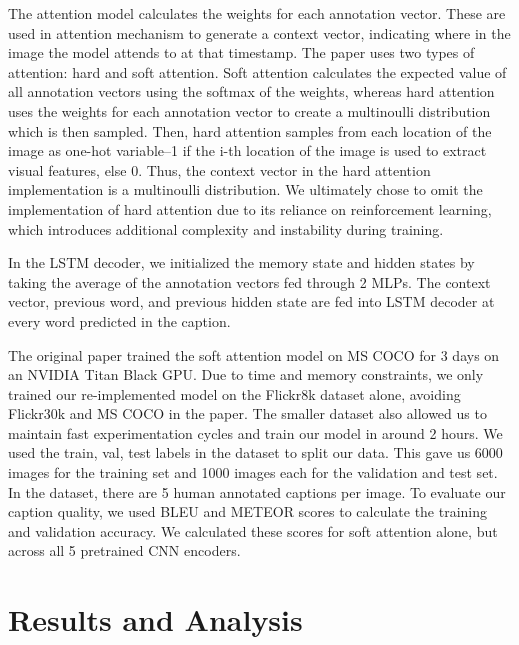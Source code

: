 \documentclass{article}
\begin{document}
The attention model calculates the weights for each annotation vector. These are used in attention mechanism to generate a context vector, indicating where in the image the model attends to at that timestamp. The paper uses two types of attention: hard and soft attention. Soft attention calculates the expected value of all annotation vectors using the softmax of the weights, whereas hard attention uses the weights for each annotation vector to create a multinoulli distribution which is then sampled. Then, hard attention samples from each location of the image as one-hot variable--1 if the i-th location of the image is used to extract visual features, else 0. Thus, the context vector in the hard attention implementation is a multinoulli distribution. We ultimately chose to omit the implementation of hard attention due to its reliance on reinforcement learning, which introduces additional complexity and instability during training. 

In the LSTM decoder, we initialized the memory state and hidden states by taking the average of the annotation vectors fed through 2 MLPs. The context vector, previous word, and previous hidden state are fed into LSTM decoder at every word predicted in the caption.

The original paper trained the soft attention model on MS COCO for 3 days on an NVIDIA Titan Black GPU. Due to time and memory constraints, we only trained our re-implemented model on the Flickr8k dataset alone, avoiding Flickr30k and MS COCO in the paper. The smaller dataset also allowed us to maintain fast experimentation cycles and train our model in around 2 hours. We used the train, val, test labels in the dataset to split our data. This gave us 6000 images for the training set and 1000 images each for the validation and test set. In the dataset, there are 5 human annotated captions per image. To evaluate our caption quality, we used BLEU and METEOR scores to calculate the training and validation accuracy. We calculated these scores for soft attention alone, but across all 5 pretrained CNN encoders.


\section{Results and Analysis}
\end{document}
